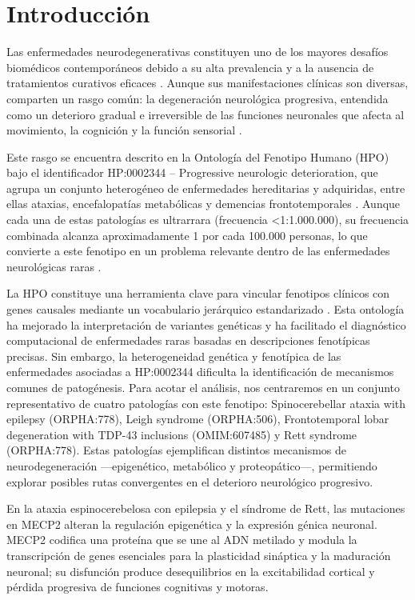 
\section{Introducción}

Las enfermedades neurodegenerativas constituyen uno de los mayores desafíos biomédicos contemporáneos debido a su alta prevalencia y a la ausencia de tratamientos curativos eficaces \cite{Kelser2024} . Aunque sus manifestaciones clínicas son diversas, comparten un rasgo común: la degeneración neurológica progresiva, entendida como un deterioro gradual e irreversible de las funciones neuronales que afecta al movimiento, la cognición y la función sensorial \cite{Gao2008} .

Este rasgo se encuentra descrito en la Ontología del Fenotipo Humano (HPO) bajo el identificador HP:0002344 – Progressive neurologic deterioration, que agrupa un conjunto heterogéneo de enfermedades hereditarias y adquiridas, entre ellas ataxias, encefalopatías metabólicas y demencias frontotemporales \cite{Wakap2020} . Aunque cada una de estas patologías es ultrarrara (frecuencia <1:1.000.000), su frecuencia combinada alcanza aproximadamente 1 por cada 100.000 personas, lo que convierte a este fenotipo en un problema relevante dentro de las enfermedades neurológicas raras \cite{HPO_term_HP0002344} .

La HPO constituye una herramienta clave para vincular fenotipos clínicos con genes causales mediante un vocabulario jerárquico estandarizado \cite{Wakap2019} . Esta ontología ha mejorado la interpretación de variantes genéticas y ha facilitado el diagnóstico computacional de enfermedades raras basadas en descripciones fenotípicas precisas. 
Sin embargo, la heterogeneidad genética y fenotípica de las enfermedades asociadas a HP:0002344 dificulta la identificación de mecanismos comunes de patogénesis. Para acotar el análisis, nos centraremos en un conjunto representativo de cuatro patologías con este fenotipo: Spinocerebellar ataxia with epilepsy (ORPHA:778), Leigh syndrome (ORPHA:506), Frontotemporal lobar degeneration with TDP-43 inclusions (OMIM:607485) y Rett syndrome (ORPHA:778). Estas patologías ejemplifican distintos mecanismos de neurodegeneración —epigenético, metabólico y proteopático—, permitiendo explorar posibles rutas convergentes en el deterioro neurológico progresivo.

En la ataxia espinocerebelosa con epilepsia y el síndrome de Rett, las mutaciones en MECP2 alteran la regulación epigenética y la expresión génica neuronal. MECP2 codifica una proteína que se une al ADN metilado y modula la transcripción de genes esenciales para la plasticidad sináptica y la maduración neuronal; su disfunción produce desequilibrios en la excitabilidad cortical y pérdida progresiva de funciones cognitivas y motoras.

